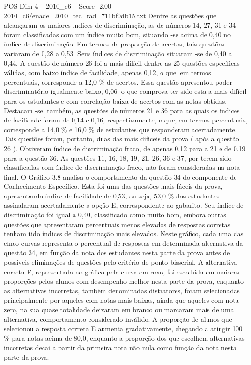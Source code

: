 \begin{textsample}{POS Dim 4 – 2010\_c6 – Score -2.00 – 2010\_c6/enade\_2010\_tec\_rad\_711bf0db15.txt}
Dentre as questões que alcançaram os maiores índices de discriminação, as de números 14, 27, 31 e 34 foram classificadas com um índice muito bom, situando -se acima de 0,40 no índice de discriminação.
Em termos de proporção de acertos, tais questões variaram de 0,28 a 0,53.
Seus índices de discriminação situaram -se de 0,40 a 0,44.
A questão de número 26 foi a mais difícil dentre as 25 questões específicas válidas, com baixo índice de facilidade, apenas 0,12, o que, em termos percentuais, corresponde a 12,0 \% de acertos.
Essa questão apresentou poder discriminatório igualmente baixo, 0,06, o que comprova ter sido esta a mais difícil para os estudantes e com correlação baixa de acertos com as notas obtidas.
Destacam -se, também, as questões de números 21 e 36 para as quais os índices de facilidade foram de 0,14 e 0,16, respectivamente, o que, em termos percentuais, corresponde a 14,0 \% e 16,0 \% de estudantes que responderam acertadamente.
Tais questões foram, portanto, duas das mais difíceis da prova ( após a questão 26 ).
Obtiveram índice de discriminação fraco, de apenas 0,12 para a 21 e de 0,19 para a questão 36.
As questões 11, 16, 18, 19, 21, 26, 36 e 37, por terem sido classificadas com índice de discriminação fraco, não foram consideradas na nota final.
O Gráfico 3.8 analisa o comportamento da questão 34 do componente de Conhecimento Específico.
Esta foi uma das questões mais fáceis da prova, apresentando índice de facilidade de 0,53, ou seja, 53,0 \% dos estudantes assinalaram acertadamente a opção E, correspondente ao gabarito.
Seu índice de discriminação foi igual a 0,40, classificado como muito bom, embora outras questões que apresentaram percentuais menos elevados de respostas corretas tenham tido índices de discriminação mais elevados.
Neste gráfico, cada uma das cinco curvas representa o percentual de respostas em determinada alternativa da questão 34, em função da nota dos estudantes nesta parte da prova antes de possíveis eliminações de questões pelo critério do ponto bisserial.
A alternativa correta E, representada no gráfico pela curva em roxo, foi escolhida em maiores proporções pelos alunos com desempenho melhor nesta parte da prova, enquanto as alternativas incorretas, também denominadas distratores, foram selecionadas principalmente por aqueles com notas mais baixas, ainda que aqueles com nota zero, na sua quase totalidade deixaram em branco ou marcaram mais de uma alternativa, comportamento considerado inválido.
A proporção de alunos que selecionou a resposta correta E aumenta gradativamente, chegando a atingir 100 \% para notas acima de 80,0, enquanto a proporção dos que escolhem alternativas incorretas decai a partir da primeira nota não nula como função da nota nesta parte da prova.

\end{textsample}
